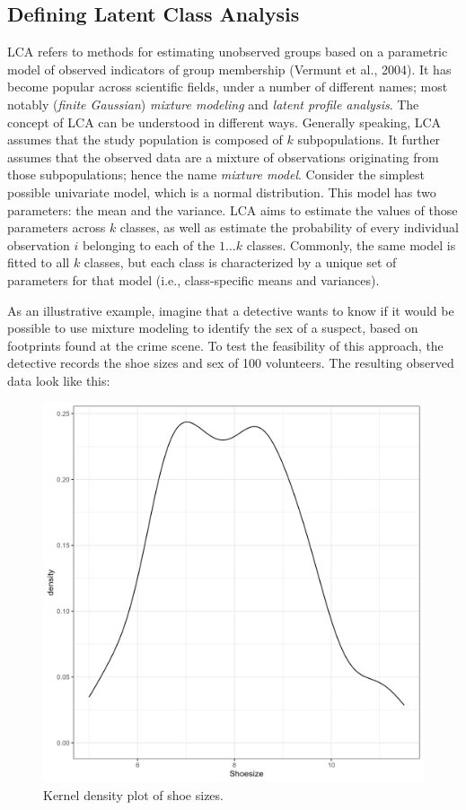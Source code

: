 \documentclass[
  ,man,floatsintext]{apa6}
\begin{document}
\hypertarget{defining-latent-class-analysis}{%
\subsection{Defining Latent Class Analysis}\label{defining-latent-class-analysis}}

LCA refers to methods for estimating unobserved
groups based on a parametric model of observed indicators of group
membership (Vermunt et al., 2004).
It has become popular across scientific fields,
under a number of different names;
most notably (\emph{finite Gaussian}) \emph{mixture modeling} and \emph{latent profile analysis}.
The concept of LCA can be understood in different ways.
Generally speaking, LCA assumes that the study population is composed of \(k\)
subpopulations.
It further assumes that the observed data are
a mixture of observations originating from those subpopulations;
hence the name \emph{mixture model}.
Consider the simplest possible
univariate model, which is a normal distribution.
This model has two parameters: the mean and the variance.
LCA aims to estimate the values of those parameters across \(k\) classes,
as well as estimate the probability of every individual observation \(i\) belonging to each of the \(1 \ldots k\) classes.
Commonly, the same model is fitted to all \(k\) classes,
but each class is characterized by a unique set of parameters for that model (i.e., class-specific means and variances).

As an illustrative example, imagine that a detective wants to know if it
would be possible to use mixture modeling to identify the sex of a
suspect, based on footprints found at the crime scene. To test the
feasibility of this approach, the detective records the shoe sizes and
sex of 100 volunteers. The resulting observed data look like this:

\begin{figure}
\includegraphics[width=7in]{shoedens} \caption{Kernel density plot of shoe sizes.}\label{fig:shoedens}
\end{figure}
\end{document}
